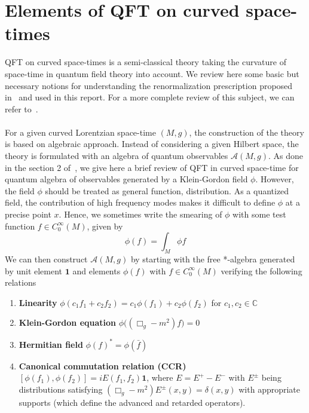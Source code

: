 \chapter{Elements of QFT on curved space-times}\label{appendix-qftcst}
QFT on curved space-times is a semi-classical theory taking the curvature of space-time in quantum field theory into account.
We review here some basic but necessary notions for understanding the renormalization prescription proposed in~\cite{Zahn2015} and used in this report.
For a more complete review of this subject, we can refer to~\cite{Hollands2014}. \\\\
%
For a given curved Lorentzian space-time $(M,g)$,
the construction of the theory is based on algebraic approach.
Instead of considering a given Hilbert space, 
the theory is formulated with an algebra of quantum observables $\mathscr{A}(M,g)$.
As done in the section 2 of~\cite{Hollands2014}, we give here a brief review of QFT in curved space-time for quantum algebra of observables generated by a Klein-Gordon field $\phi$. 
However, the field $\phi$ should be treated as general function, \ie  distribution.
As a quantized field, the contribution of high frequency modes makes it difficult to define $\phi$ at a precise point $x$.
Hence, we sometimes write the smearing of $\phi$ with some test function $f\in C^\infty_0(M)$, given by
\begin{equation*}
\phi(f) = \int_M \phi f
\end{equation*}
We can then construct $\mathscr{A}(M,g)$ by starting with the free *-algebra generated by unit element $\mathbf{1}$ and elements $\phi(f)$ with $f\in C^\infty_0(M)$ verifying the following relations \\
\begin{enumerate}
\item \textbf{Linearity} $\phi(c_1 f_1 + c_2 f_2) = c_1 \phi(f_1) + c_2 \phi(f_2)$ for $c_1, c_2 \in \mathbb{C}$
%
\item \textbf{Klein-Gordon equation} $\phi\big( (\Box_g - m^2)f \big) = 0$
%
\item \textbf{Hermitian field} $\phi(f)^* = \phi(\bar{f})$
%
\item \textbf{Canonical commutation relation (CCR)} $[\phi(f_1), \phi(f_2)] = iE(f_1, f_2) \mathbf{1}$, where $E = E^+ - E^-$ with $E^\pm$ being distributions satisfying $(\Box_g - m^2)E^\pm(x,y) = \delta(x,y)$ with appropriate supports (which define the advanced and retarded operators).
\end{enumerate}
